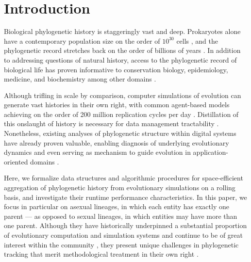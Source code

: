 \section{Introduction} \label{sec:introduction}

Biological phylogenetic history is staggeringly vast and deep.
Prokaryotes alone have a contemporary population size on the order of $10^{30}$ cells \citep{whitman1998prokaryotes}, and the phylogenetic record stretches back on the order of billions of years \citep{arndt2012processes}.
In addition to addressing questions of natural history, access to the phylogenetic record of biological life has proven informative to conservation biology, epidemiology, medicine, and biochemistry among other domains \citep{faithConservationEvaluationPhylogenetic1992, STAMATAKIS2005phylogenetics, frenchHostPhylogenyShapes2023,kim2006discovery}.

Although trifling in scale by comparison, computer simulations of evolution can generate vast histories in their own right, with common agent-based models achieving on the order of 200 million replication cycles per day \citep{ofria2009artificial}.
Distillation of this onslaught of history is necessary for data management tractability \citep{dolson2020interpreting}.
Nonetheless, existing analyses of phylogenetic structure within digital systems have already proven valuable, enabling diagnosis of underlying evolutionary dynamics \citep{moreno2023toward,hernandez2022can,shahbandegan2022untangling, lewinsohnStatedependentEvolutionaryModels2023a} and even serving as mechanism to guide evolution in application-oriented domains \cite{lalejini2024phylogeny,lalejini2024runtime,murphy2008simple,burke2003increased}.

Here, we formalize data structures and algorithmic procedures for space-efficient aggregation of phylogenetic history from evolutionary simulations on a rolling basis, and investigate their runtime performance characteristics.
In this paper, we focus in particular on asexual lineages, in which each entity has exactly one parent --- as opposed to sexual lineages, in which entities may have more than one parent.
Although they have historically underpinned a substantial proportion of evolutionary computation and simulation systems \citep{koza1994genetic,jefferson1990evolution} and continue to be of great interest within the community \citep{dang2018escaping}, they present unique challenges in phylogenetic tracking that merit methodological treatment in their own right \citep{godin2019apoget,moreno2024methods,mcphee2018detailed}.


